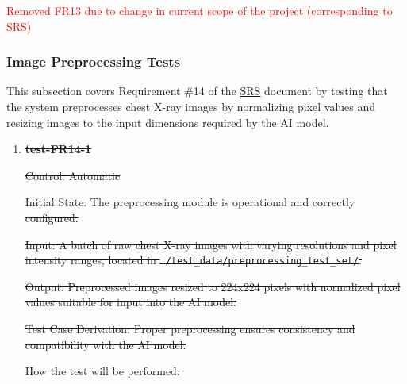 \documentclass[12pt, titlepage]{article}
\begin{document}
\begin{enumerate}
\begin{enumerate}
\textcolor{red}{Removed FR13 due to change in current scope of the project (corresponding to SRS)}

\subsubsection{Image Preprocessing Tests}

This subsection covers Requirement \#14 of the \href{https://github.com/RezaJodeiri/CXR-Capstone/blob/main/docs/SRS/SRS.pdf}{SRS} \citep{SRS}
document by testing that the system preprocesses chest X-ray images by normalizing pixel values and resizing images to the input dimensions required by the AI model.

\begin{enumerate}

\item \textbf{\sout{test-FR14-1}} \label{test-FR14-1}

\sout{Control: Automatic}

\sout{Initial State: The preprocessing module is operational and correctly configured.}

\sout{Input: A batch of raw chest X-ray images with varying resolutions and pixel intensity ranges, located in \texttt{./test\_data/preprocessing\_test\_set/}.}

\sout{Output: Preprocessed images resized to 224x224 pixels with normalized pixel values suitable for input into the AI model.}

\sout{Test Case Derivation: Proper preprocessing ensures consistency and compatibility with the AI model.}

\sout{How the test will be performed:}


\end{enumerate}
\end{enumerate}
\end{enumerate}
\end{document}
